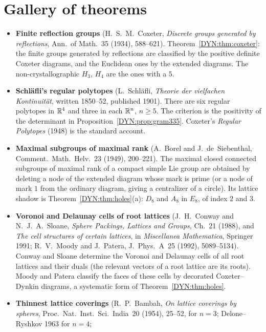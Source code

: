 \section{Gallery of theorems}
\label{DYN:sec:gallery}

\begin{itemize}[leftmargin=1.2em,itemsep=0.45em]
\item \textbf{Finite reflection groups} (H.~S.~M.~Coxeter, \emph{Discrete groups generated by reflections},
  Ann.\ of Math.~35 (1934), 588--621). Theorem~\ref{DYN:thm:coxeter}: the finite groups generated by
  reflections are classified by the positive definite Coxeter diagrams, and the Euclidean ones by the
  extended diagrams. The non-crystallographic $H_3$, $H_4$ are the ones with a $5$.
\item \textbf{Schl\"afli's regular polytopes} (L.~Schl\"afli, \emph{Theorie der vielfachen Kontinuit\"at},
  written 1850--52, published 1901). There are six regular polytopes in $\mathbb{R}^4$ and three in each
  $\mathbb{R}^n$, $n\ge5$. The criterion is the positivity of the determinant in
  Proposition~\ref{DYN:prop:gram335}. Coxeter's \emph{Regular Polytopes} (1948) is the standard account.
\item \textbf{Maximal subgroups of maximal rank} (A.~Borel and J.~de~Siebenthal, Comment.\ Math.\ Helv.~23
  (1949), 200--221). The maximal closed connected subgroups of maximal rank of a compact simple Lie group
  are obtained by deleting a node of the extended diagram whose mark is prime (or a node of mark $1$ from the
  ordinary diagram, giving a centralizer of a circle). Its lattice shadow is Theorem~\ref{DYN:thm:holes}(a):
  $D_8$ and $A_8$ in $E_8$, of index $2$ and $3$.
\item \textbf{Voronoi and Delaunay cells of root lattices} (J.~H.~Conway and N.~J.~A.~Sloane, \emph{Sphere
  Packings, Lattices and Groups}, Ch.~21 (1988), and \emph{The cell structures of certain lattices}, in
  \emph{Miscellanea Mathematica}, Springer 1991; R.~V.~Moody and J.~Patera, J.\ Phys.~A~25 (1992),
  5089--5134). Conway and Sloane determine the Voronoi and Delaunay cells of all root lattices and their
  duals (the relevant vectors of a root lattice are its roots). Moody and Patera classify the faces of
  these cells by decorated Coxeter--Dynkin diagrams, a systematic form of Theorem~\ref{DYN:thm:holes}.
\item \textbf{Thinnest lattice coverings} (R.~P.~Bambah, \emph{On lattice coverings by spheres}, Proc.\
  Nat.\ Inst.\ Sci.\ India~20 (1954), 25--52, for $n=3$; Delone--Ryshkov 1963 for $n=4$;

\end{itemize}

